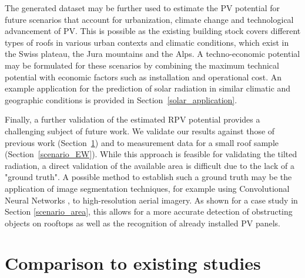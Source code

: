 The generated dataset may be further used to estimate the PV potential for future scenarios that account for urbanization, climate change and technological advancement of PV.
This is possible as the existing building stock covers different types of roofs in various urban contexts and climatic conditions, which exist in the Swiss plateau, the Jura mountains and the Alps. 
A techno-economic potential may be formulated for these scenarios by combining the maximum technical potential with economic factors such as installation and operational cost.
An example application for the prediction of solar radiation in similar climatic and geographic conditions is provided in Section~\ref{solar_application}.

Finally, a further validation of the estimated RPV potential provides a challenging subject of future work. 
We validate our results against those of previous work (Section~\ref{solar_comparison}) and to measurement data for a small roof sample (Section~\ref{scenario_EW}).
While this approach is feasible for validating the tilted radiation, a direct validation of the available area is difficult due to the lack of a "ground truth". A possible method to establish such a ground truth may be the application of image segmentation techniques, for example using Convolutional Neural Networks \cite{castello_deep_2019}, to high-resolution aerial imagery. 
As shown for a case study in Section \ref{scenario_area}, this allows for a more accurate detection of obstructing objects on rooftops as well as the recognition of already installed PV panels.



\section{Comparison to existing studies}
\label{solar_comparison}


